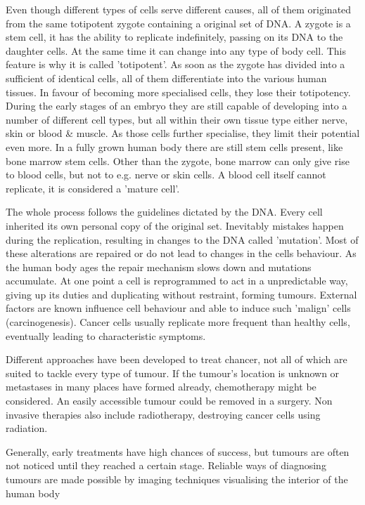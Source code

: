 Even though different types of cells serve different causes, all of them originated from the same totipotent zygote containing a original set of DNA.
A zygote is a stem cell, it has the ability to replicate indefinitely, passing on its DNA to the daughter cells.
At the same time it can change into any type of body cell. This feature is why it is called 'totipotent'.
As soon as the zygote has divided into a sufficient of identical cells, all of them differentiate into the various human tissues.
In favour of becoming more specialised cells, they lose their totipotency.
During the early stages of an embryo they are still capable of developing into a number of different cell types, but all within their own tissue type  either nerve, skin or blood \& muscle.
As those cells further specialise, they limit their potential even more.
In a fully grown human body there are still stem cells present, like bone marrow stem cells.
Other than the zygote, bone marrow can only give rise to blood cells, but not to e.g. nerve or skin cells.
A blood cell itself cannot replicate, it is considered a 'mature cell'.

The whole process follows the guidelines dictated by the DNA. Every cell inherited its own personal copy of the original set.
Inevitably mistakes happen during the replication, resulting in changes to the DNA called 'mutation'.
Most of these alterations are repaired or do not lead to changes in the cells behaviour.
As the human body ages the repair mechanism slows down and mutations accumulate.
At one point a cell is reprogrammed to act in a unpredictable way, giving up its duties and duplicating without restraint, forming tumours.
External factors are known influence cell behaviour and able to induce such 'malign' cells (carcinogenesis).
Cancer cells usually replicate more frequent than healthy cells, eventually leading to characteristic symptoms.

Different approaches have been developed to treat chancer, not all of which are suited to tackle every type of tumour.
If the tumour's location is unknown or metastases in many places have formed already, chemotherapy might be considered.
An easily accessible tumour could be removed in a surgery.
Non invasive therapies also include radiotherapy, destroying cancer cells using radiation.

Generally, early treatments have high chances of success, but tumours are often not noticed until they reached a certain stage. 
Reliable ways of diagnosing tumours are made possible by imaging techniques visualising the interior of the human body 

